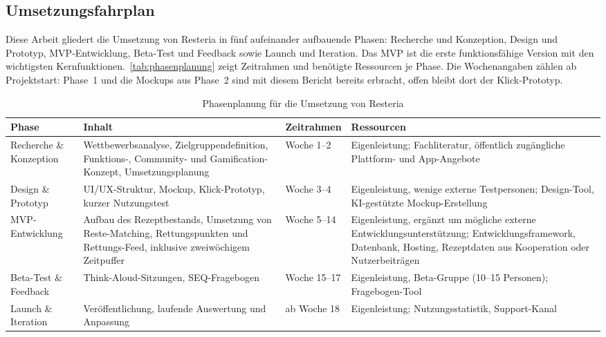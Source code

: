 \subsection{Umsetzungsfahrplan}\label{sec:phasenplanung}

Diese Arbeit gliedert die Umsetzung von Resteria in fünf aufeinander aufbauende Phasen: Recherche und Konzeption, Design und Prototyp, \ac{MVP}-Entwicklung, Beta-Test und Feedback sowie Launch und Iteration. Das \ac{MVP} ist die erste funktionsfähige Version mit den wichtigsten Kernfunktionen.~\autoref{tab:phasenplanung} zeigt Zeitrahmen und benötigte Ressourcen je Phase. Die Wochenangaben zählen ab Projektstart: Phase~1 und die Mockups aus Phase~2 sind mit diesem Bericht bereits erbracht, offen bleibt dort der Klick-Prototyp.

\begin{table}[htbp]
\caption{Phasenplanung für die Umsetzung von Resteria}\label{tab:phasenplanung}
{\footnotesize
\begin{tabularx}{\textwidth}{@{}l X l X@{}}
\toprule
\textbf{Phase} & \textbf{Inhalt} & \textbf{Zeitrahmen} & \textbf{Ressourcen} \\
\midrule
Recherche \& Konzeption & Wettbewerbsanalyse, Zielgruppendefinition, Funktions-, Community- und Gamification-Konzept, Umsetzungsplanung & Woche 1--2 & Eigenleistung; Fachliteratur, öffentlich zugängliche Plattform- und App-Angebote \\
Design \& Prototyp & UI/UX-Struktur, Mockup, Klick-Prototyp, kurzer Nutzungstest & Woche 3--4 & Eigenleistung, wenige externe Testpersonen; Design-Tool, KI-gestützte Mockup-Erstellung \\
\ac{MVP}-Entwicklung & Aufbau des Rezeptbestands, Umsetzung von Reste-Matching, Rettungspunkten und Rettungs-Feed, inklusive zweiwöchigem Zeitpuffer & Woche 5--14 & Eigenleistung, ergänzt um mögliche externe Entwicklungsunterstützung; Entwicklungsframework, Datenbank, Hosting, Rezeptdaten aus Kooperation oder Nutzerbeiträgen \\
Beta-Test \& Feedback & Think-Aloud-Sitzungen, \ac{SEQ}-Fragebogen & Woche 15--17 & Eigenleistung, Beta-Gruppe (10--15 Personen); Fragebogen-Tool \\
Launch \& Iteration & Veröffentlichung, laufende Auswertung und Anpassung & ab Woche 18 & Eigenleistung; Nutzungsstatistik, Support-Kanal \\
\bottomrule
\end{tabularx}
}
\end{table}

